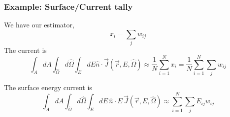 \documentclass{report}
\newcommand{\hhh}[1]{\subsubsection*{#1}}
\newcommand{\pos}{\vec{r}}
\newcommand{\cur}{\vec{J}}
\newcommand{\Oh}{\hat{\Omega}}
\newcommand{\rEO}{(\pos,E,\Oh)}
\begin{document}
\hhh{Example: Surface/Current tally}
We have our estimator,
$$ x_i = \sum_j w_{ij} $$
The current is 
$$ \int_A dA \int_{\Oh} d\Oh \int_E dE \hat{n}\cdot \cur\rEO \approx \frac{1}{N} \sum_{i=1}^N x_i = \frac{1}{N} \sum_{i=1}^N \sum_j w_{ij}$$

The surface energy current is
$$ \int_A dA \int_{\Oh} d\Oh \int_E dE \, \hat{n}\cdot E\,\cur\rEO \approx \sum_{i=1}^N \sum_j E_{ij} w_{ij} $$
\end{document}
